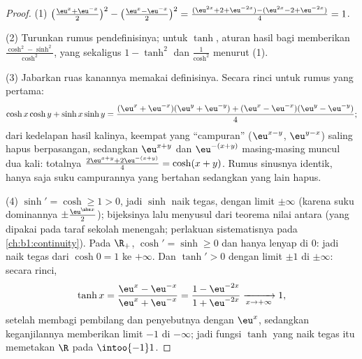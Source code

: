 \begin{proof}
(1) $\bigl(\frac{\eu^x + \eu^{-x}}{2}\bigr)^2 - \bigl(\frac{\eu^x -
\eu^{-x}}{2}\bigr)^2 = \frac{(\eu^{2x} + 2 + \eu^{-2x}) - (\eu^{2x} -
2 + \eu^{-2x})}{4} = 1$.

(2) Turunkan rumus pendefinisinya; untuk $\tanh$, aturan hasil bagi
memberikan $\frac{\cosh^2 - \sinh^2}{\cosh^2}$, yang sekaligus
$1 - \tanh^2$ dan $\frac{1}{\cosh^2}$ menurut (1).

(3) Jabarkan ruas kanannya memakai definisinya. Secara rinci
untuk rumus yang pertama:
\[
\cosh x\cosh y + \sinh x\sinh y
= \frac{(\eu^x + \eu^{-x})(\eu^y + \eu^{-y})
+ (\eu^x - \eu^{-x})(\eu^y - \eu^{-y})}{4} ;
\]
dari kedelapan hasil kalinya, keempat yang ``campuran''
($\eu^{x-y}$, $\eu^{y-x}$) saling hapus berpasangan, sedangkan
$\eu^{x+y}$ dan $\eu^{-(x+y)}$ masing-masing muncul dua kali:
totalnya $\frac{2\eu^{x+y} + 2\eu^{-(x+y)}}{4} = \cosh(x+y)$.
Rumus sinusnya identik, hanya saja suku campurannya yang bertahan
sedangkan yang lain hapus.

(4) $\sinh' = \cosh \geq 1 > 0$, jadi $\sinh$ naik tegas,
dengan limit $\pm\infty$ (karena suku dominannya $\pm\frac{\eu^{\abs
x}}{2}$);  bijeksinya lalu menyusul dari teorema nilai
antara (yang dipakai pada taraf sekolah menengah; perlakuan sistematisnya pada
\cref{ch:b1:continuity}). Pada $\R_+$, $\cosh' = \sinh \geq 0$
dan hanya lenyap di $0$: jadi naik tegas dari $\cosh 0 = 1$ ke
$+\infty$. Dan $\tanh' > 0$ dengan limit $\pm 1$ di $\pm\infty$: secara
rinci,
\[
\tanh x = \frac{\eu^x - \eu^{-x}}{\eu^x + \eu^{-x}}
= \frac{1 - \eu^{-2x}}{1 + \eu^{-2x}}
\xrightarrow[x \to +\infty]{} 1 ,
\]
setelah membagi pembilang dan penyebutnya dengan $\eu^x$, sedangkan keganjilannya
memberikan limit $-1$ di $-\infty$; jadi fungsi $\tanh$ yang naik
tegas itu memetakan $\R$ pada $\intoo{-1}1$.
\end{proof}

